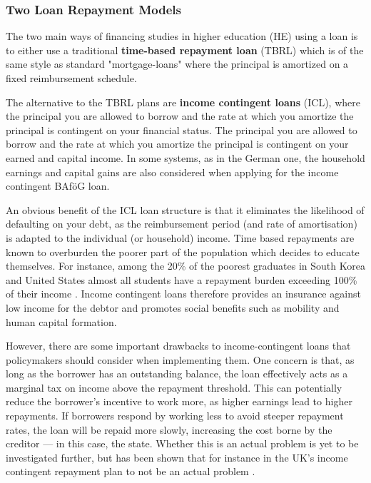 \subsubsection{Two Loan Repayment Models}
\label{subsection:loan-repayment-plan}
The two main ways of financing studies in higher education (HE) using a loan is to either use a traditional 
\textbf{time-based repayment loan} (TBRL) which is of the same style as standard "mortgage-loans" 
where the principal is amortized on a fixed reimbursement schedule.

The alternative to the TBRL plans are \textbf{income contingent loans} (ICL), where the 
principal you are allowed to borrow and the rate at which you amortize the principal is contingent on your financial status. The principal you are allowed to borrow and the 
rate at which you amortize the principal is contingent on your earned 
and capital income. In some systems, as in the German one, the household earnings 
and capital gains are also considered when applying for the income contingent BAföG loan.

An obvious benefit of the ICL loan structure is that it eliminates the likelihood 
of defaulting on your debt, as the reimbursement period 
(and rate of amortisation) is adapted to the individual (or household) income. 
Time based repayments are known to overburden the poorer part of the population which decides to 
educate themselves. For instance, among the 20\% of the poorest graduates in South Korea and United States 
almost all students have a repayment burden exceeding 100\% of their income 
\citep{chapman_income-contingent_2022}. 
Income contingent loans therefore provides an insurance against low income for the debtor and promotes social benefits such as mobility and human capital formation.

However, there are some important drawbacks to income-contingent loans that policymakers should consider when implementing them. 
One concern is that, as long as the borrower has an outstanding balance, the loan effectively acts as a marginal tax on income above the repayment threshold. 
This can potentially reduce the borrower’s incentive to work more, as higher earnings lead to higher repayments. 
If borrowers respond by working less to avoid steeper repayment rates, the loan will be repaid more slowly, increasing the cost borne by the creditor — in this case, the state.
Whether this is an actual problem is yet to be investigated further, but has been
shown that for instance in the UK's income contingent repayment plan to not 
be an actual problem \citep{britton_income_2020}. 

